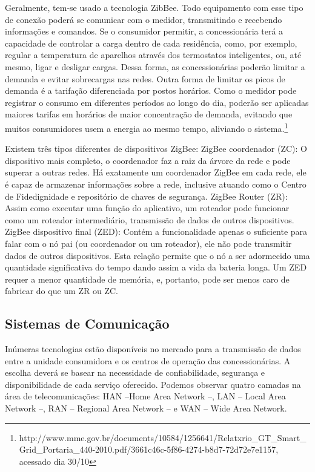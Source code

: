 	Geralmente, tem-se usado a tecnologia ZibBee. Todo equipamento com esse tipo de conexão poderá se comunicar com o medidor, transmitindo e recebendo informações e comandos. Se o consumidor permitir, a concessionária terá a capacidade de controlar a carga dentro de cada residência, como, por exemplo, regular a temperatura de aparelhos através dos termostatos inteligentes, ou, até mesmo, ligar e desligar cargas. Dessa forma, as concessionárias poderão limitar a demanda e evitar sobrecargas nas redes. Outra forma de limitar os picos de demanda é a tarifação diferenciada por postos horários. Como o medidor pode registrar o consumo em diferentes períodos ao longo do dia, poderão ser aplicadas maiores tarifas em horários de maior concentração de demanda, evitando que muitos consumidores usem a energia ao mesmo tempo, aliviando o sistema.\footnote{http://www.mme.gov.br/documents/10584/1256641/Relatxrio\_GT\_Smart\_Grid\_Portaria\_440-2010.pdf/3661c46c-5f86-4274-b8d7-72d72e7e1157, acessado dia 30/10}
	
	Existem três tipos diferentes de dispositivos ZigBee: ZigBee coordenador (ZC): O dispositivo mais completo, o coordenador faz a raiz da árvore da rede e pode superar a outras redes. Há exatamente um coordenador ZigBee em cada rede, ele é capaz de armazenar informações sobre a rede, inclusive atuando como o Centro de Fidedignidade e repositório de chaves de segurança. ZigBee Router (ZR): Assim como executar uma função do aplicativo, um roteador pode funcionar como um roteador intermediário, transmissão de dados de outros dispositivos. ZigBee dispositivo final (ZED): Contém a funcionalidade apenas o suficiente para falar com o nó pai (ou coordenador ou um roteador), ele não pode transmitir dados de outros dispositivos. Esta relação permite que o nó a ser adormecido uma quantidade significativa do tempo dando assim a vida da bateria longa. Um ZED requer a menor quantidade de memória, e, portanto, pode ser menos caro de fabricar do que um ZR ou ZC.
	
\subsection{Sistemas de Comunicação}

	Inúmeras tecnologias estão disponíveis no mercado para a transmissão de dados entre a unidade consumidora e os centros de operação das concessionárias. A escolha deverá se basear na necessidade de confiabilidade, segurança e disponibilidade de cada serviço oferecido. Podemos observar quatro camadas na área de telecomunicações: HAN –Home Area Network –, LAN – Local Area Network –, RAN – Regional Area Network – e WAN – Wide Area Network.
	
